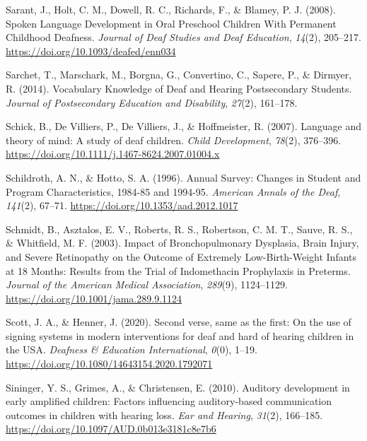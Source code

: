 \documentclass[
  english,
  man]{apa6}
\begin{document}
\leavevmode\hypertarget{ref-sarant2008}{}%
Sarant, J., Holt, C. M., Dowell, R. C., Richards, F., \& Blamey, P. J. (2008). Spoken Language Development in Oral Preschool Children With Permanent Childhood Deafness. \emph{Journal of Deaf Studies and Deaf Education}, \emph{14}(2), 205--217. \url{https://doi.org/10.1093/deafed/enn034}

\leavevmode\hypertarget{ref-sarchet2014}{}%
Sarchet, T., Marschark, M., Borgna, G., Convertino, C., Sapere, P., \& Dirmyer, R. (2014). Vocabulary Knowledge of Deaf and Hearing Postsecondary Students. \emph{Journal of Postsecondary Education and Disability}, \emph{27}(2), 161--178.

\leavevmode\hypertarget{ref-schick2007}{}%
Schick, B., De Villiers, P., De Villiers, J., \& Hoffmeister, R. (2007). Language and theory of mind: A study of deaf children. \emph{Child Development}, \emph{78}(2), 376--396. \url{https://doi.org/10.1111/j.1467-8624.2007.01004.x}

\leavevmode\hypertarget{ref-schildroth1996}{}%
Schildroth, A. N., \& Hotto, S. A. (1996). Annual Survey: Changes in Student and Program Characteristics, 1984-85 and 1994-95. \emph{American Annals of the Deaf}, \emph{141}(2), 67--71. \url{https://doi.org/10.1353/aad.2012.1017}

\leavevmode\hypertarget{ref-schmidt2003}{}%
Schmidt, B., Asztalos, E. V., Roberts, R. S., Robertson, C. M. T., Sauve, R. S., \& Whitfield, M. F. (2003). Impact of Bronchopulmonary Dysplasia, Brain Injury, and Severe Retinopathy on the Outcome of Extremely Low-Birth-Weight Infants at 18 Months: Results from the Trial of Indomethacin Prophylaxis in Preterms. \emph{Journal of the American Medical Association}, \emph{289}(9), 1124--1129. \url{https://doi.org/10.1001/jama.289.9.1124}

\leavevmode\hypertarget{ref-scott2020}{}%
Scott, J. A., \& Henner, J. (2020). Second verse, same as the first: On the use of signing systems in modern interventions for deaf and hard of hearing children in the USA. \emph{Deafness \& Education International}, \emph{0}(0), 1--19. \url{https://doi.org/10.1080/14643154.2020.1792071}

\leavevmode\hypertarget{ref-sininger2010}{}%
Sininger, Y. S., Grimes, A., \& Christensen, E. (2010). Auditory development in early amplified children: Factors influencing auditory-based communication outcomes in children with hearing loss. \emph{Ear and Hearing}, \emph{31}(2), 166--185. \url{https://doi.org/10.1097/AUD.0b013e3181c8e7b6}
\end{document}
